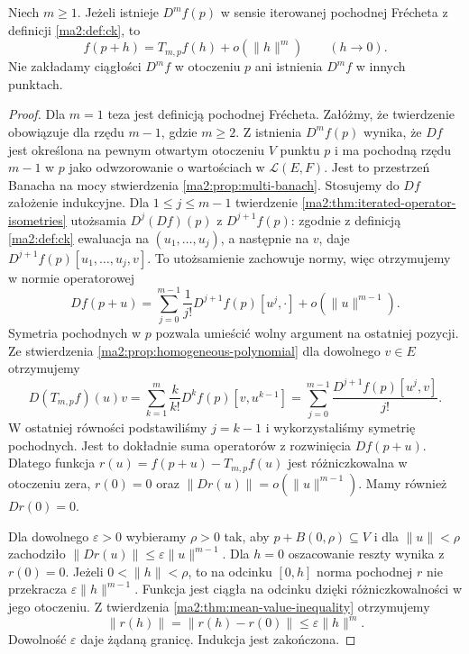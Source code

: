 \begin{twierdzenie}
\label{ma2:thm:taylor-peano}
Niech $m\ge1$. Jeżeli istnieje $D^mf(p)$ w sensie
iterowanej pochodnej Frécheta z definicji \ref{ma2:def:ck},
to
\[
 f(p+h)=T_{m,p}f(h)+o(\|h\|^m)\qquad(h\to0).
\]
Nie zakładamy ciągłości $D^mf$ w otoczeniu $p$ ani
istnienia $D^mf$ w innych punktach.
\end{twierdzenie}
\begin{proof}
Dla $m=1$ teza jest definicją pochodnej Frécheta.
Załóżmy, że twierdzenie obowiązuje dla rzędu $m-1$,
gdzie $m\ge2$. Z istnienia $D^mf(p)$ wynika, że
$Df$ jest określona na pewnym otwartym otoczeniu $V$
punktu $p$ i ma pochodną rzędu $m-1$ w $p$ jako
odwzorowanie o wartościach w $\mathcal L(E,F)$.
Jest to przestrzeń Banacha na mocy stwierdzenia
\ref{ma2:prop:multi-banach}. Stosujemy do $Df$
założenie indukcyjne. Dla $1\le j\le m-1$
twierdzenie \ref{ma2:thm:iterated-operator-isometries}
utożsamia $D^j(Df)(p)$ z $D^{j+1}f(p)$: zgodnie
z definicją \ref{ma2:def:ck} ewaluacja na
$(u_1,\ldots,u_j)$, a następnie na $v$, daje
$D^{j+1}f(p)[u_1,\ldots,u_j,v]$.
To utożsamienie zachowuje normy, więc otrzymujemy
w normie operatorowej
\[
 Df(p+u)=\sum_{j=0}^{m-1}\frac{1}{j!}
 D^{j+1}f(p)[u^j,\cdot]+o(\|u\|^{m-1}).
\]
Symetria pochodnych w $p$ pozwala umieścić wolny
argument na ostatniej pozycji.
Ze stwierdzenia \ref{ma2:prop:homogeneous-polynomial}
dla dowolnego $v\in E$ otrzymujemy
\[
 D(T_{m,p}f)(u)v
 =\sum_{k=1}^m\frac{k}{k!}D^kf(p)[v,u^{k-1}]
 =\sum_{j=0}^{m-1}\frac{D^{j+1}f(p)[u^j,v]}{j!}.
\]
W ostatniej równości podstawiliśmy $j=k-1$
i wykorzystaliśmy symetrię pochodnych. Jest to
dokładnie suma operatorów z rozwinięcia $Df(p+u)$.
Dlatego funkcja $r(u)=f(p+u)-T_{m,p}f(u)$
jest różniczkowalna w otoczeniu zera, $r(0)=0$
oraz $\|Dr(u)\|=o(\|u\|^{m-1})$. Mamy również $Dr(0)=0$.

Dla dowolnego $\varepsilon>0$ wybieramy $\rho>0$ tak,
aby $p+B(0,\rho)\subseteq V$ i dla $\|u\|<\rho$
zachodziło $\|Dr(u)\|\le\varepsilon\|u\|^{m-1}$.
Dla $h=0$ oszacowanie reszty wynika z $r(0)=0$.
Jeżeli $0<\|h\|<\rho$, to na odcinku $[0,h]$
norma pochodnej $r$ nie przekracza
$\varepsilon\|h\|^{m-1}$. Funkcja jest ciągła
na odcinku dzięki różniczkowalności w jego otoczeniu.
Z twierdzenia \ref{ma2:thm:mean-value-inequality}
otrzymujemy
\[
 \|r(h)\|=\|r(h)-r(0)\|\le\varepsilon\|h\|^m.
\]
Dowolność $\varepsilon$ daje żądaną granicę.
Indukcja jest zakończona.
\end{proof}

